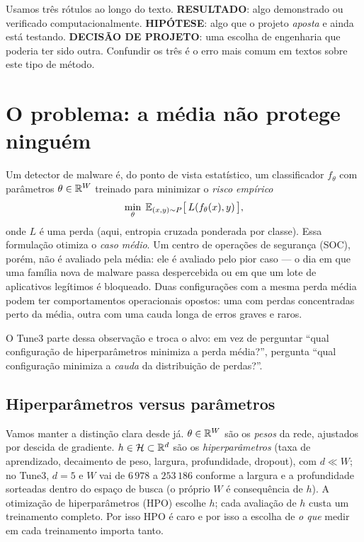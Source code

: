 \begin{ideia}
Usamos três rótulos ao longo do texto. \textbf{RESULTADO}: algo demonstrado ou verificado computacionalmente. \textbf{HIPÓTESE}: algo que o projeto \emph{aposta} e ainda está testando. \textbf{DECISÃO DE PROJETO}: uma escolha de engenharia que poderia ter sido outra. Confundir os três é o erro mais comum em textos sobre este tipo de método.
\end{ideia}

\section{O problema: a média não protege ninguém}\label{sec:problema}

Um detector de malware é, do ponto de vista estatístico, um classificador $f_\theta$ com parâmetros $\theta\in\mathbb{R}^W$ treinado para minimizar o \emph{risco empírico}
\[
\min_\theta\; \mathbb{E}_{(x,y)\sim P}\big[\,L(f_\theta(x),y)\,\big],
\]
onde $L$ é uma perda (aqui, entropia cruzada ponderada por classe). Essa formulação otimiza o \emph{caso médio}. Um centro de operações de segurança (SOC), porém, não é avaliado pela média: ele é avaliado pelo pior caso --- o dia em que uma família nova de malware passa despercebida ou em que um lote de aplicativos legítimos é bloqueado. Duas configurações com a mesma perda média podem ter comportamentos operacionais opostos: uma com perdas concentradas perto da média, outra com uma cauda longa de erros graves e raros.

O Tune3 parte dessa observação e troca o alvo: em vez de perguntar ``qual configuração de hiperparâmetros minimiza a perda média?'', pergunta ``qual configuração minimiza a \emph{cauda} da distribuição de perdas?''.

\subsection{Hiperparâmetros versus parâmetros}
Vamos manter a distinção clara desde já. $\theta\in\mathbb{R}^W$ são os \emph{pesos} da rede, ajustados por descida de gradiente. $h\in\mathcal H\subset\mathbb{R}^d$ são os \emph{hiperparâmetros} (taxa de aprendizado, decaimento de peso, largura, profundidade, dropout), com $d\ll W$; no Tune3, $d=5$ e $W$ vai de $6\,978$ a $253\,186$ conforme a largura e a profundidade sorteadas dentro do espaço de busca (o próprio $W$ é consequência de $h$). A otimização de hiperparâmetros (HPO) escolhe $h$; cada avaliação de $h$ custa um treinamento completo. Por isso HPO é caro e por isso a escolha de \emph{o que} medir em cada treinamento importa tanto.

